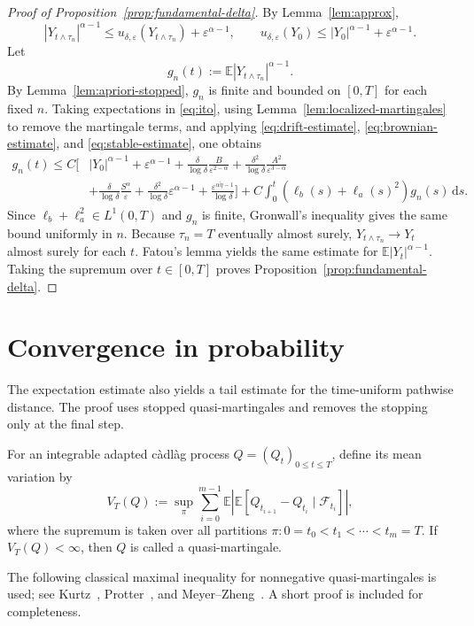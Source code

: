 \documentclass[11pt]{article}
\newcommand{\E}{\mathbb{E}}
\newcommand{\F}{\mathcal{F}}
\newcommand{\1}{\mathbf{1}}
\newcommand{\dd}{\,\mathrm{d}}
\newcommand{\wt}{\tilde}
\newcommand{\eps}{\varepsilon}
\begin{document}
\begin{proof}[Proof of Proposition~\ref{prop:fundamental-delta}]
By Lemma~\ref{lem:approx},
\[
  |Y_{t\wedge\tau_n}|^{\alpha-1}\le u_{\delta,\eps}(Y_{t\wedge\tau_n})+\eps^{\alpha-1},
  \qquad
  u_{\delta,\eps}(Y_0)\le |Y_0|^{\alpha-1}+\eps^{\alpha-1}.
\]
Let
\[
  g_n(t):=\E|Y_{t\wedge\tau_n}|^{\alpha-1}.
\]
By Lemma~\ref{lem:apriori-stopped}, $g_n$ is finite and bounded on $[0,T]$ for each fixed $n$. Taking expectations in \eqref{eq:ito}, using Lemma~\ref{lem:localized-martingales} to remove the martingale terms, and applying \eqref{eq:drift-estimate}, \eqref{eq:brownian-estimate}, and \eqref{eq:stable-estimate}, one obtains
\begin{align*}
g_n(t)
\le C\Bigg[&|Y_0|^{\alpha-1}
+\eps^{\alpha-1}
+\frac{\delta}{\log\delta}\frac{B}{\eps^{2-\alpha}}
+\frac{\delta^2}{\log\delta}\frac{A^2}{\eps^{3-\alpha}}\\
&+\frac{\delta}{\log\delta}\frac{S^\alpha}{\eps}
+\frac{\delta^2}{\log\delta}\eps^{\alpha-1}
+\frac{\eps^{\alpha\wt\eta-1}}{\log\delta}
\Bigg]
+C\int_0^t\left(\ell_b(s)+\ell_a(s)^2\right)g_n(s)\dd s.
\end{align*}
Since $\ell_b+\ell_a^2\in L^1(0,T)$ and $g_n$ is finite, Gronwall's inequality gives the same bound uniformly in $n$. Because $\tau_n=T$ eventually almost surely, $Y_{t\wedge\tau_n}\to Y_t$ almost surely for each $t$. Fatou's lemma yields the same estimate for $\E|Y_t|^{\alpha-1}$. Taking the supremum over $t\in[0,T]$ proves Proposition~\ref{prop:fundamental-delta}.
\end{proof}

\section{Convergence in probability}
\label{sec:probability}

The expectation estimate also yields a tail estimate for the time-uniform pathwise distance. The proof uses stopped quasi-martingales and removes the stopping only at the final step.

For an integrable adapted c\`adl\`ag process $Q=(Q_t)_{0\le t\le T}$, define its mean variation by
\[
  V_T(Q):=\sup_\pi\sum_{i=0}^{m-1}
  \E\left|\E\left[Q_{t_{i+1}}-Q_{t_i}\mid\F_{t_i}\right]\right|,
\]
where the supremum is taken over all partitions $\pi:0=t_0<t_1<\cdots<t_m=T$. If $V_T(Q)<\infty$, then $Q$ is called a quasi-martingale.

The following classical maximal inequality for nonnegative quasi-martingales is used; see Kurtz~\cite[Lemma~5.3]{Kurtz1991}, Protter~\cite[Chapter~III]{Protter2004}, and Meyer--Zheng~\cite{MeyerZheng1984}. A short proof is included for completeness.
\end{document}
